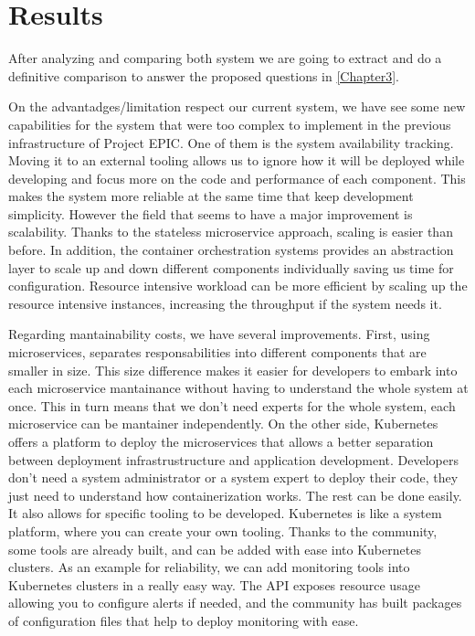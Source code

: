 
\chapter{Results} %

\label{Chapter7} %


After analyzing and comparing both system we are going to extract and do a definitive comparison to answer the proposed questions in \autoref{Chapter3}.

On the advantadges/limitation respect our current system, we have see some new capabilities for the system that were too complex to implement in the previous infrastructure of Project EPIC. One of them is the system availability tracking. Moving it to an external tooling allows us to ignore how it will be deployed while developing and focus more on the code and performance of each component. This makes the system more reliable at the same time that keep development simplicity. However the field that seems to have a major improvement is scalability. Thanks to the stateless microservice approach, scaling is easier than before. In addition, the container orchestration systems provides an abstraction layer to scale up and down different components individually saving us time for configuration. Resource intensive workload can be more efficient by scaling up the resource intensive instances, increasing the throughput if the system needs it. 

Regarding mantainability costs, we have several improvements. First, using microservices, separates responsabilities into different components that are smaller in size. This size difference makes it easier for developers to embark into each microservice mantainance without having to understand the whole system at once. This in turn means that we don't need experts for the whole system, each microservice can be mantainer independently. On the other side, Kubernetes offers a platform to deploy the microservices that allows a better separation between deployment infrastrustructure and application development. Developers don’t need a system administrator or a system expert to deploy their code, they just need to understand how containerization works. The rest can be done easily. It also allows for specific tooling to be developed. Kubernetes is like a system platform, where you can create your own tooling. Thanks to the community, some tools are already built, and can be added with ease into Kubernetes clusters. As an example for reliability, we can add monitoring tools into Kubernetes clusters in a really easy way. The API exposes resource usage allowing you to configure alerts if needed, and the community has built packages of configuration files that help to deploy monitoring with ease.

